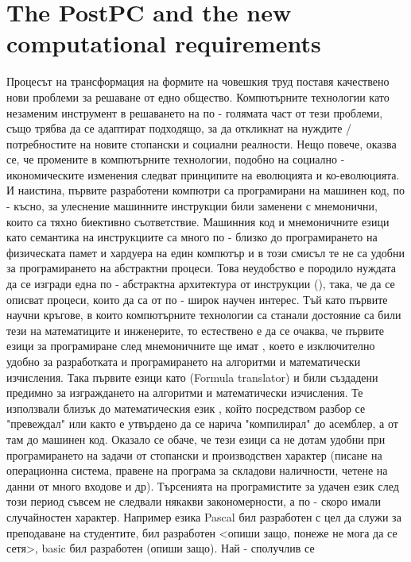 \section{The PostPC and the new computational requirements}

Процесът на трансформация на формите на човешкия труд поставя качествено нови проблеми за решаване от едно общество. 
Компютърните технологии като незаменим инструмент в решаването на по - голямата част от тези проблеми, също трябва 
да се адаптират подходящо, за да откликнат на нуждите / потребностите на новите стопански и социални реалности.
Нещо повече, оказва се, че промените в компютърните технологии, подобно на социално - икономическите изменения следват
принципите на еволюцията и ко-еволюцията. И наистина, първите разработени компютри са програмирани на машинен код,
по - късно, за улеснение машинните инструкции били заменени с мнемонични, които са тяхно биективно съответствие.
Машинния код и мнемоничните езици като семантика на инструкциите са много по - близко до програмирането на 
физическата памет и хардуера на един компютър и в този смисъл те не са удобни за програмирането на абстрактни процеси. 
Това неудобство е породило нуждата да се изгради една по - абстрактна архитектура от инструкции (), така, че
да се описват процеси, които да са от по - широк научен интерес. Тъй като първите научни кръгове, в които компютърните 
технологии са станали достояние са били тези на математиците и инженерите, то естествено е да се очаква, че първите
езици за програмиране след мнемоничните ще имат , което е изключително удобно за разработката и програмирането на
алгоритми и математически изчисления. Така първите езици като  (Formula translator) и  били създадени предимно
за изграждането на алгоритми и математически изчисления. Те използвали близък до математическия език , който 
посредством разбор се "превеждал" или както е утвърдено да се нарича "компилирал" до асемблер, а от там до машинен код. 
Оказало се обаче, че тези езици са не дотам удобни при програмирането на задачи от стопански и производствен характер 
(писане на операционна система, правене на програма за складови наличности, четене на данни от много входове и др).
Търсенията на програмистите за удачен език след този период съвсем не следвали някакви закономерности, а по - скоро 
имали случайностен характер. Например езика Pascal бил разработен с цел да служи за преподаване на студентите, 
 бил разработен <опиши защо, понеже не мога да се сетя>, basic бил разработен (опиши защо). Най - сполучлив се 
